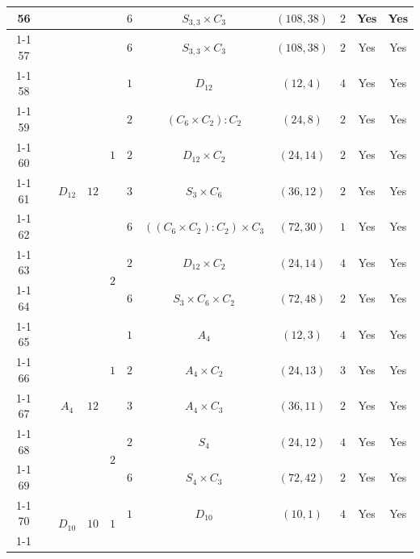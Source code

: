 \documentclass[12pt]{amsart}
\numberwithin{equation}{section}
\theoremstyle{plain}
\theoremstyle{definition}
\theoremstyle{remark}
\begin{document}
{\begin{longtable}{|c|c|c|c|c|c|c|c|c|c|c|}
56 &  &  &  &  & $6$ & \multicolumn{1}{c|}{$S_{3,3}\times C_3$} & $(108,38)$ & $2$ & Yes & Yes \\ \cline{1-1} \cline{6-11}
57 &  &  &  &  & $6$ & \multicolumn{1}{c|}{$S_{3,3}\times C_3$} & $(108,38)$ & $2$ & Yes & Yes \\ \cline{1-1} \cline{3-11}
58 &  & \multirow[t]{7}{*}{$D_{12}$} & \multirow[t]{7}{*}{$12$} & \multirow[t]{5}{*}{$1$} & $1$ & \multicolumn{1}{c|}{$D_{12}$} & $(12,4)$ & $4$ & Yes & Yes \\ \cline{1-1} \cline{6-11}
59 &  &  &  &  & $2$ & \multicolumn{1}{c|}{$(C_6\times C_2):C_2$} & $(24,8)$ & $2$ & Yes & Yes \\ \cline{1-1} \cline{6-11}
60 &  &  &  &  & $2$ & \multicolumn{1}{c|}{$D_{12}\times C_2$} & $(24,14)$ & $2$ & Yes & Yes \\ \cline{1-1} \cline{6-11}
61 &  &  &  &  & $3$ & \multicolumn{1}{c|}{$S_3\times C_6$} & $(36,12)$ & $2$ & Yes & Yes \\ \cline{1-1} \cline{6-11}
62 &  &  &  &  & $6$ & \multicolumn{1}{c|}{$((C_6\times C_2):C_2)\times C_3$} & $(72,30)$ & $1$ & Yes & Yes \\ \cline{1-1} \cline{5-11}
63 &  &  &  & \multirow[t]{2}{*}{$2$} & $2$ & \multicolumn{1}{c|}{$D_{12}\times C_2$} & $(24,14)$ & $4$ & Yes & Yes \\ \cline{1-1} \cline{6-11}
64 &  &  &  &  & $6$ & \multicolumn{1}{c|}{$S_3\times C_6\times C_2$} & $(72,48)$ & $2$ & Yes & Yes \\ \cline{1-1} \cline{3-11}
65 &  & \multirow[t]{5}{*}{$A_4$} & \multirow[t]{5}{*}{$12$} & \multirow[t]{3}{*}{$1$} & $1$ & \multicolumn{1}{c|}{$A_4$} & $(12,3)$ & $4$ & Yes & Yes \\ \cline{1-1} \cline{6-11}
66 &  &  &  &  & $2$ & \multicolumn{1}{c|}{$A_4\times C_2$} & $(24,13)$ & $3$ & Yes & Yes \\ \cline{1-1} \cline{6-11}
67 &  &  &  &  & $3$ & \multicolumn{1}{c|}{$A_4\times C_3$} & $(36,11)$ & $2$ & Yes & Yes \\ \cline{1-1} \cline{5-11}
68 &  &  &  & \multirow[t]{2}{*}{$2$} & $2$ & \multicolumn{1}{c|}{$S_4$} & $(24,12)$ & $4$ & Yes & Yes \\ \cline{1-1} \cline{6-11}
69 &  &  &  &  & $6$ & \multicolumn{1}{c|}{$S_4\times C_3$} & $(72,42)$ & $2$ & Yes & Yes \\ \cline{1-1} \cline{3-11}
70 &  & \multirow[t]{3}{*}{$D_{10}$} & \multirow[t]{3}{*}{$10$} & \multirow[t]{3}{*}{$1$} & $1$ & \multicolumn{1}{c|}{$D_{10}$} & $(10,1)$ & $4$ & Yes & Yes \\ \cline{1-1} \cline{6-11}

\end{longtable}}
\end{document}
